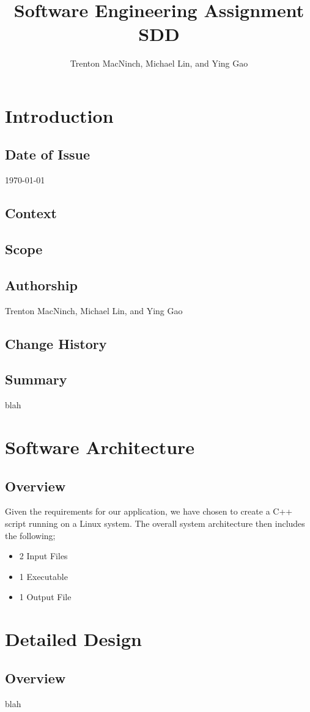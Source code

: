 \documentclass{article}
\title{\textbf{Software Engineering Assignment SDD}}
\author{Trenton MacNinch, Michael Lin, and Ying Gao}
\begin{document}
\maketitle
\newpage

\tableofcontents
\newpage

\section{Introduction}
\subsection{Date of Issue}
\today
\subsection{Context}
\subsection{Scope}
\subsection{Authorship}
Trenton MacNinch, Michael Lin, and Ying Gao
\subsection{Change History}
\subsection{Summary}
blah

\section{Software Architecture}
\subsection{Overview}
Given the requirements for our application, we have chosen to create a C++ script running on a Linux system. The overall system architecture then includes the following; 
\begin{itemize}
\item 2 Input Files
\item 1 Executable
\item 1 Output File
\end{itemize}

\section{Detailed Design}
\subsection{Overview}
blah
\end{document}
